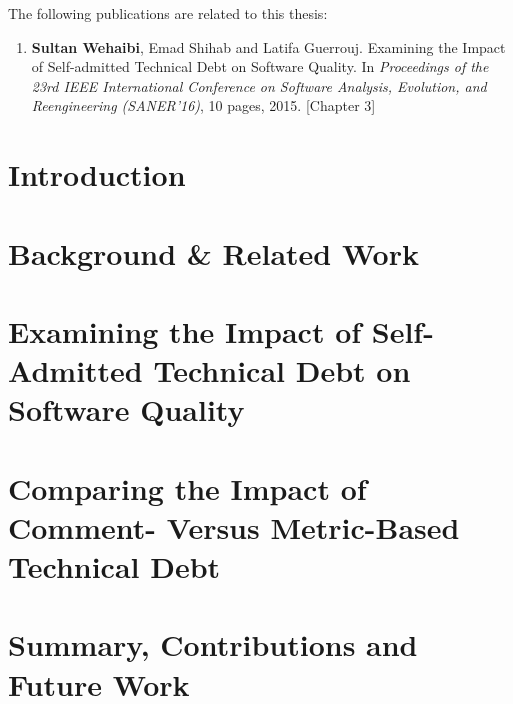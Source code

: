 \documentclass[12pt]{report}
\begin{document}
\begin{publications}

The following publications are related to this thesis:

\begin{enumerate}

\item \textbf{Sultan Wehaibi}, Emad Shihab and Latifa Guerrouj. Examining the Impact of Self-admitted Technical Debt on Software Quality. In \textit{Proceedings of the 23rd IEEE International Conference on Software Analysis, Evolution, and Reengineering (SANER’16)}, 10 pages, 2015. [Chapter 3]


\end{enumerate}

\end{publications}

\chapter{Introduction}
\label{introduction}


\chapter{Background \& Related Work}
\label{literature_review}


\chapter{Examining the Impact of Self-Admitted Technical Debt on Software Quality}
\label{chapter3}


\chapter{Comparing the Impact of Comment- Versus Metric-Based Technical Debt}
\label{chapter4}


\chapter{Summary, Contributions and Future Work}
\label{conclusion}



\begin{appendices}
	\label{appendix}
	
\end{appendices}

  

\end{document}

